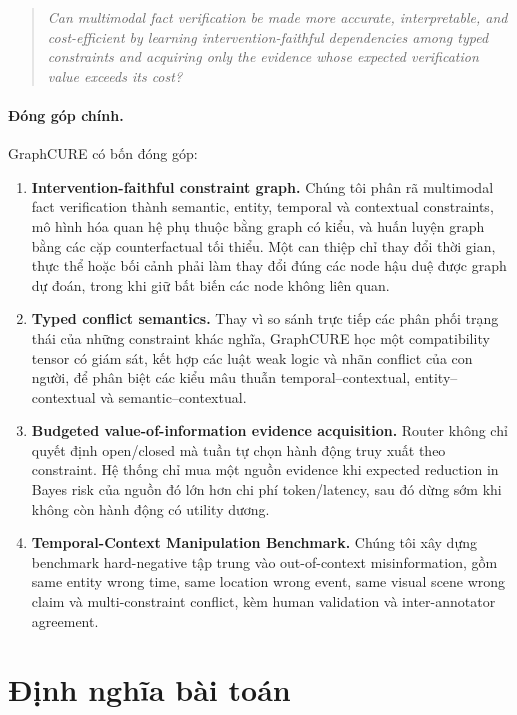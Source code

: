 \documentclass[11pt,a4paper]{article}
\begin{document}
\begin{quote}
\textit{Can multimodal fact verification be made more accurate, interpretable, and cost-efficient by learning intervention-faithful dependencies among typed constraints and acquiring only the evidence whose expected verification value exceeds its cost?}
\end{quote}

\paragraph{Đóng góp chính.}
GraphCURE có bốn đóng góp:

\begin{enumerate}[leftmargin=1.5em]
\item \textbf{Intervention-faithful constraint graph.}
Chúng tôi phân rã multimodal fact verification thành semantic, entity, temporal và contextual constraints, mô hình hóa quan hệ phụ thuộc bằng graph có kiểu, và huấn luyện graph bằng các cặp counterfactual tối thiểu. Một can thiệp chỉ thay đổi thời gian, thực thể hoặc bối cảnh phải làm thay đổi đúng các node hậu duệ được graph dự đoán, trong khi giữ bất biến các node không liên quan.

\item \textbf{Typed conflict semantics.}
Thay vì so sánh trực tiếp các phân phối trạng thái của những constraint khác nghĩa, GraphCURE học một compatibility tensor có giám sát, kết hợp các luật weak logic và nhãn conflict của con người, để phân biệt các kiểu mâu thuẫn temporal--contextual, entity--contextual và semantic--contextual.

\item \textbf{Budgeted value-of-information evidence acquisition.}
Router không chỉ quyết định open/closed mà tuần tự chọn hành động truy xuất theo constraint. Hệ thống chỉ mua một nguồn evidence khi expected reduction in Bayes risk của nguồn đó lớn hơn chi phí token/latency, sau đó dừng sớm khi không còn hành động có utility dương.

\item \textbf{Temporal-Context Manipulation Benchmark.}
Chúng tôi xây dựng benchmark hard-negative tập trung vào out-of-context misinformation, gồm same entity wrong time, same location wrong event, same visual scene wrong claim và multi-constraint conflict, kèm human validation và inter-annotator agreement.
\end{enumerate}

\section{Định nghĩa bài toán}
\end{document}
